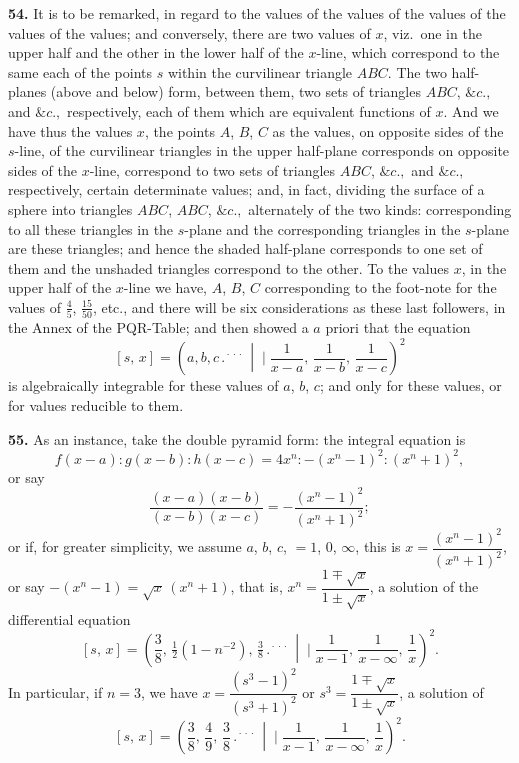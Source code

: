 \documentclass[11pt]{article}
\newcommand{\artno}[1]{\textbf{#1.}\quad}
\begin{document}
\artno{54} It is to be remarked, in regard to the values of the values of the values of the values of the values; and conversely, there are two values of $x$, viz.\
one in the upper half and the other in the lower half of the $x$-line, which correspond to the same
each of the points $s$ within the curvilinear triangle $ABC$. The two half-planes (above
and below) form, between them, two sets of triangles $ABC$, $\&c.,$ and $\&c.,$ respectively,
each of them which are equivalent functions of $x$. And we have thus the values $x$,
the points $A$, $B$, $C$ as the values, on opposite sides of the $s$-line, of the curvilinear triangles in the upper half-plane corresponds on opposite sides
of the $x$-line, correspond to two sets of triangles $ABC$, $\&c.,$ and $\&c.,$ respectively,
certain determinate values; and, in fact, dividing the surface of a sphere into
triangles $ABC$, $ABC$, $\&c.,$ alternately of the two kinds: corresponding to all these triangles in
the $s$-plane and the corresponding triangles in the $s$-plane are these
triangles; and hence the shaded half-plane corresponds to one set of them and
the unshaded triangles correspond to the other. To the values $x$, in the upper half of the $x$-line we have, $A$, $B$, $C$ corresponding to the foot-note for the values of $\frac{4}{5}$, $\frac{15}{50}$, etc., and there will be six considerations as these
last followers, in the Annex of the PQR-Table; and then showed a $a$ priori that the equation
\[
   [s,\,x] = \left(a, b, c \,.{}^{\!\cdot\!\cdot\!\cdot}\,\middle|\!\!\!\mid \frac{1}{x-a},\,\frac{1}{x-b},\,\frac{1}{x-c}\right)^{\!2}
\]
is algebraically integrable for these values of $a$, $b$, $c$; and only for these values, or
for values reducible to them.

\newpage
\artno{55} As an instance, take the double pyramid form: the integral equation is
\[
   f(x-a) : g(x-b) : h(x-c) = 4 x^{n} : -(x^{n} - 1)^{2} : (x^{n} + 1)^{2},
\]
or say
\[
   \frac{(x-a)(x-b)}{(x-b)(x-c)} = -\frac{(x^{n} - 1)^{2}}{(x^{n} + 1)^{2}};
\]
or if, for greater simplicity, we assume $a$, $b$, $c$, $= 1$, $0$, $\infty$, this is $x = \dfrac{(x^{n} - 1)^{2}}{(x^{n} + 1)^{2}}$, or say
$-(x^{n} - 1) = \sqrt{x}\,(x^{n} + 1)$, that is, $x^{n} = \dfrac{1 \mp \sqrt{x}}{1 \pm \sqrt{x}}$, a solution of the differential equation
\[
   [s,\,x] = \left(\frac{3}{8},\,\tfrac{1}{2}(1 - n^{-2}),\,\tfrac{3}{8} \,.{}^{\!\cdot\!\cdot\!\cdot}\,\middle|\!\!\!\mid \frac{1}{x - 1},\,\frac{1}{x - \infty},\,\frac{1}{x}\right)^{\!2}.
\]
In particular, if $n = 3$, we have $x = \dfrac{(s^{3} - 1)^{2}}{(s^{3} + 1)^{2}}$ or $s^{3} = \dfrac{1 \mp \sqrt{x}}{1 \pm \sqrt{x}}$, a solution of
\[
   [s,\,x] = \left(\frac{3}{8},\,\frac{4}{9},\,\frac{3}{8} \,.{}^{\!\cdot\!\cdot\!\cdot}\,\middle|\!\!\!\mid \frac{1}{x - 1},\,\frac{1}{x - \infty},\,\frac{1}{x}\right)^{\!2}.
\]
\end{document}
